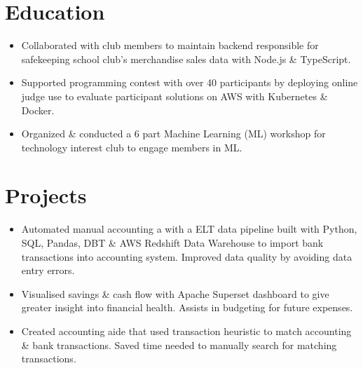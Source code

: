 \section{Education}
\begin{itemize}
  \item Collaborated with club members to maintain backend responsible for safekeeping school club's merchandise sales data with Node.js \& TypeScript.
\end{itemize}
\begin{itemize}
  \item Supported programming contest with over 40 participants by deploying online judge use to evaluate participant solutions on AWS with Kubernetes \& Docker.
  \item Organized \& conducted a 6 part Machine Learning  (ML) workshop for technology interest club to engage members in ML.
\end{itemize}

\section{Projects}

\begin{itemize}
  \item Automated manual accounting a with a ELT data pipeline built with Python, SQL, Pandas, DBT \& AWS Redshift Data Warehouse to import bank transactions into accounting system. Improved data quality by avoiding data entry errors.
  \item Visualised savings \& cash flow with Apache Superset dashboard to give greater insight into financial health. Assists in budgeting for future expenses.
  \item Created accounting aide that used transaction heuristic to match accounting \& bank transactions. Saved time needed to manually search for matching transactions.
\end{itemize}

